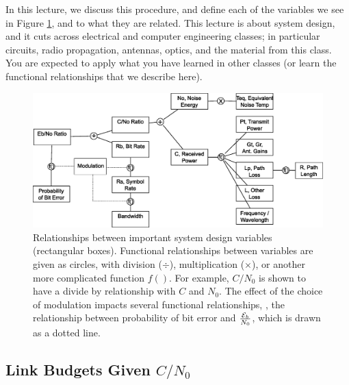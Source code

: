In this lecture, we discuss this procedure, and define each of the variables we see in Figure \ref{F:RelationshipsFlowChart}, and to what they are related.  This lecture is about system design, and it cuts across electrical and computer engineering classes; in particular circuits, radio propagation, antennas, optics, and the material from this class.  You are expected to apply what you have learned in other classes (or learn the functional relationships that we describe here).

\begin{figure}[htbp]
    \includegraphics[width=6.5in]{../images/relationshipGraphDigiComm.eps}
    \caption{Relationships between important system design variables (rectangular boxes).  Functional relationships between variables are given as circles, with   division ($\div$), multiplication ($\times$), or another more complicated function $f()$. For example, $C/N_0$ is shown to have a divide by relationship with $C$ and $N_0$.  The effect of the choice of modulation impacts several functional relationships, \eg, the relationship between probability of bit error and $\frac{\mathcal{E}_b}{N_0}$, which is drawn as a dotted line.}
    \label{F:RelationshipsFlowChart}
\end{figure}

\subsection{Link Budgets Given $C/N_0$}

